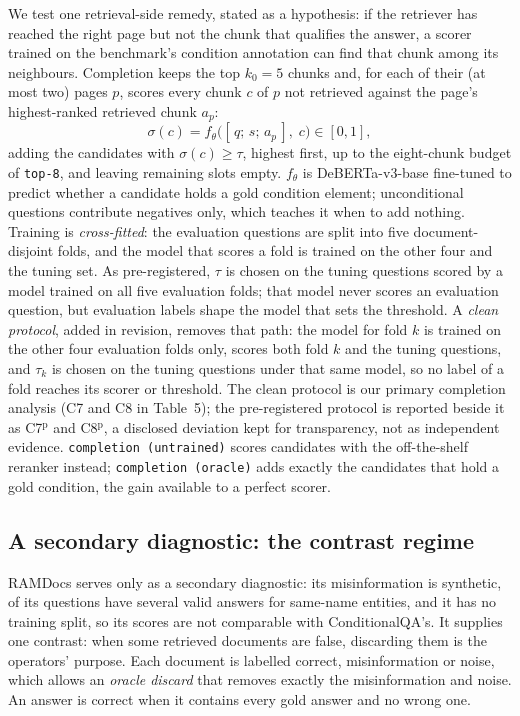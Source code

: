 We test one retrieval-side remedy, stated as a hypothesis: if the retriever has reached the right page but not the chunk that qualifies the answer, a scorer trained on the benchmark's condition annotation can find that chunk among its neighbours. Completion keeps the top $k_0=5$ chunks and, for each of their (at most two) pages $p$, scores every chunk $c$ of $p$ not retrieved against the page's highest-ranked retrieved chunk $a_p$:
\begin{equation}
\sigma(c) = f_\theta\big([\,q;\, s;\, a_p\,],\; c\big) \in [0,1],
\end{equation}
adding the candidates with $\sigma(c)\geq\tau$, highest first, up to the eight-chunk budget of \texttt{top-8}, and leaving remaining slots empty. $f_\theta$ is DeBERTa-v3-base \cite{he2023debertav3} fine-tuned to predict whether a candidate holds a gold condition element; unconditional questions contribute negatives only, which teaches it when to add nothing. Training is \emph{cross-fitted}: the evaluation questions are split into five document-disjoint folds, and the model that scores a fold is trained on the other four and the tuning set. As pre-registered, $\tau$ is chosen on the tuning questions scored by a model trained on all five evaluation folds; that model never scores an evaluation question, but evaluation labels shape the model that sets the threshold. A \emph{clean protocol}, added in revision, removes that path: the model for fold $k$ is trained on the other four evaluation folds only, scores both fold $k$ and the tuning questions, and $\tau_k$ is chosen on the tuning questions under that same model, so no label of a fold reaches its scorer or threshold. The clean protocol is our primary completion analysis (C7 and C8 in Table~5); the pre-registered protocol is reported beside it as C7$^{\mathrm{p}}$ and C8$^{\mathrm{p}}$, a disclosed deviation kept for transparency, not as independent evidence. \texttt{completion (untrained)} scores candidates with the off-the-shelf reranker instead; \texttt{completion (oracle)} adds exactly the candidates that hold a gold condition, the gain available to a perfect scorer.

\subsection{A secondary diagnostic: the contrast regime}

RAMDocs \cite{wang2025madam} serves only as a secondary diagnostic: its misinformation is synthetic, \nRamMulti{} of its \nRamQ{} questions have several valid answers for same-name entities, and it has no training split, so its scores are not comparable with ConditionalQA's. It supplies one contrast: when some retrieved documents are false, discarding them is the operators' purpose. Each document is labelled correct, misinformation or noise, which allows an \emph{oracle discard} that removes exactly the misinformation and noise. An answer is correct when it contains every gold answer and no wrong one.

